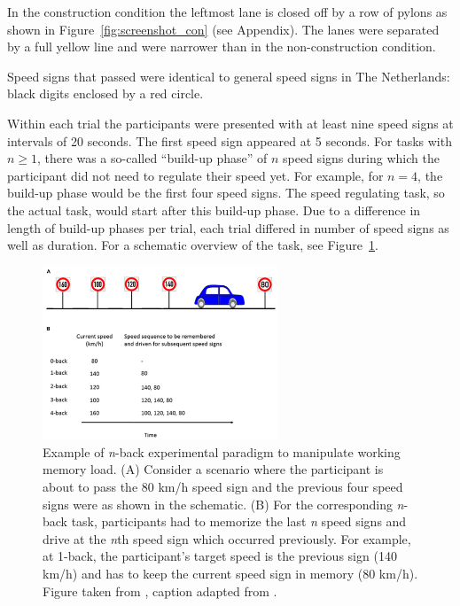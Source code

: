 In the construction condition the leftmost lane is closed off by a row of pylons as shown in Figure~\ref{fig:screenshot_con} (see Appendix). 
The lanes were separated by a full yellow line and were narrower than in the non-construction condition. 

Speed signs that passed were identical to general speed signs in The Netherlands: black digits enclosed by a red circle. 

Within each trial the participants were presented with at least nine speed signs at intervals of 20 seconds. 
The first speed sign appeared at 5 seconds.
For \nback tasks with \(n \geq 1\), there was a so-called ``build-up phase'' of \(n\) speed signs during which the participant did not need to regulate their speed yet. 
For example, for \(n = 4\), the build-up phase would be the first four speed signs. 
The speed regulating task, so the actual \nback task, would start after this build-up phase. 
Due to a difference in length of build-up phases per \nback trial, each trial differed in number of speed signs as well as duration.
For a schematic overview of the \nback task, see Figure~\ref{fig:nback_scheme}.

\begin{figure}
  \centering
  \includegraphics[width=7cm]{images/nback_Scheunemann.pdf}
  \caption{Example of \textit{n}-back experimental paradigm to manipulate working memory load. 
  (A) Consider a scenario where the participant is about to pass the 80 km/h speed sign and the previous four speed signs were as shown in the schematic.
  (B) For the corresponding \textit{n}-back task, participants had to memorize the last \textit{n} speed signs and drive at the \textit{n}th speed sign which occurred previously.
  For example, at 1-back, the participant’s target speed is the previous sign (140 km/h) and has to keep the current speed sign in memory (80 km/h).
  Figure taken from \citet{Unni2017}, caption adapted from \citet{Scheunemann2019}.}
  \label{fig:nback_scheme}
\end{figure}

